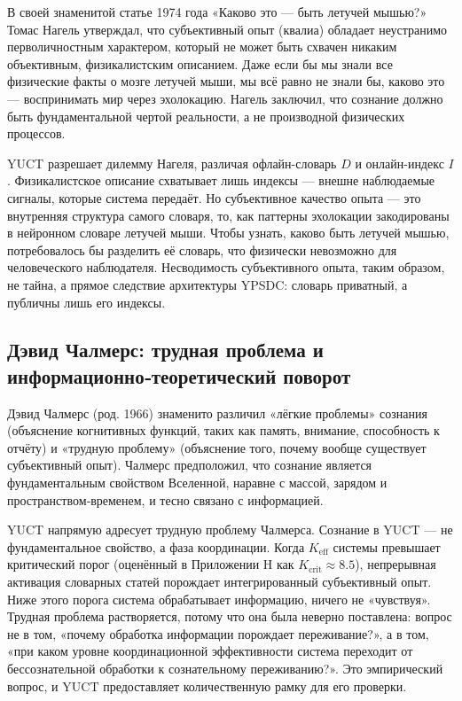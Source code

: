 \documentclass[12pt,a4paper]{article}
\begin{document}
	В своей знаменитой статье 1974 года «Каково это — быть летучей мышью?» Томас Нагель утверждал, что субъективный опыт (квалиа) обладает неустранимо перволичностным характером, который не может быть схвачен никаким объективным, физикалистским описанием. Даже если бы мы знали все физические факты о мозге летучей мыши, мы всё равно не знали бы, каково это — воспринимать мир через эхолокацию. Нагель заключил, что сознание должно быть фундаментальной чертой реальности, а не производной физических процессов.
	
	YUCT разрешает дилемму Нагеля, различая офлайн-словарь \(D\) и онлайн-индекс \(I\). Физикалистское описание схватывает лишь индексы — внешне наблюдаемые сигналы, которые система передаёт. Но субъективное качество опыта — это внутренняя структура самого словаря, то, как паттерны эхолокации закодированы в нейронном словаре летучей мыши. Чтобы узнать, каково быть летучей мышью, потребовалось бы разделить её словарь, что физически невозможно для человеческого наблюдателя. Несводимость субъективного опыта, таким образом, не тайна, а прямое следствие архитектуры YPSDC: словарь приватный, а публичны лишь его индексы.
	
	\subsection{Дэвид Чалмерс: трудная проблема и \\ информационно‑теоретический поворот}
	
	Дэвид Чалмерс (род. 1966) знаменито различил «лёгкие проблемы» сознания (объяснение когнитивных функций, таких как память, внимание, способность к отчёту) и «трудную проблему» (объяснение того, почему вообще существует субъективный опыт). Чалмерс предположил, что сознание является фундаментальным свойством Вселенной, наравне с массой, зарядом и пространством‑временем, и тесно связано с информацией.
	
	YUCT напрямую адресует трудную проблему Чалмерса. Сознание в YUCT — не фундаментальное свойство, а фаза координации. Когда \(K_{\mathrm{eff}}\) системы превышает критический порог (оценённый в Приложении H как \(K_{\mathrm{crit}} \approx 8.5\)), непрерывная активация словарных статей порождает интегрированный субъективный опыт. Ниже этого порога система обрабатывает информацию, ничего не «чувствуя». Трудная проблема растворяется, потому что она была неверно поставлена: вопрос не в том, «почему обработка информации порождает переживание?», а в том, «при каком уровне координационной эффективности система переходит от бессознательной обработки к сознательному переживанию?». Это эмпирический вопрос, и YUCT предоставляет количественную рамку для его проверки.
	
\end{document}
